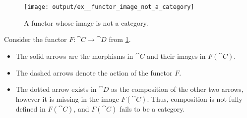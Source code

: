 \begin{example}\label{ex:functor_image_not_a_category}
  \begin{figure}[!ht]
    \hfill
    \texttt{[image: output/ex\_\_functor\_image\_not\_a\_category]}
    \hfill
    \hfill
    \caption{A functor whose image is not a category.}\label{fig:ex:functor_image_not_a_category}
  \end{figure}

  Consider the functor \( F: \cat{C} \to \cat{D} \) from \cref{fig:ex:functor_image_not_a_category}.

  \begin{itemize}
    \item The solid arrows are the morphisms in \( \cat{C} \) and their images in \( F(\cat{C}) \).
    \item The dashed arrows denote the action of the functor \( F \).
    \item The dotted arrow exists in \( \cat{D} \) as the composition of the other two arrows, however it is missing in the image \( F(\cat{C}) \). Thus, composition is not fully defined in \( F(\cat{C}) \), and \( F(\cat{C}) \) fails to be a category.
  \end{itemize}
\end{example}

